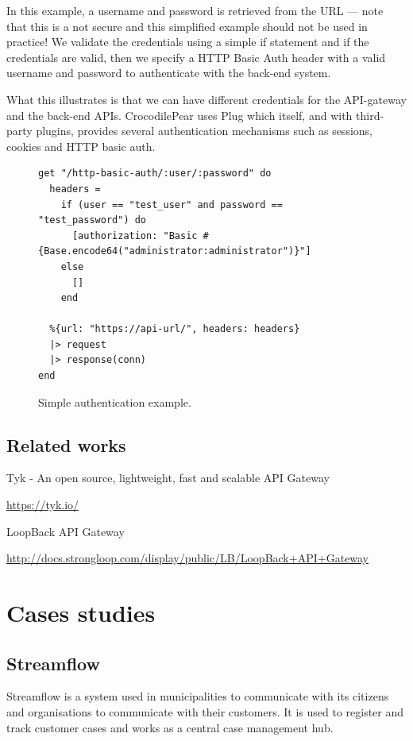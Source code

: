 \documentclass{cslthse-msc}
\begin{document}
In this example, a username and password is retrieved from the URL --- note that this is a not secure and this simplified example should not be used in practice! We validate the credentials using a simple if statement and if the credentials are valid, then we specify a HTTP Basic Auth header with a valid username and password to authenticate with the back-end system.

What this illustrates is that we can have different credentials for the API-gateway and the back-end APIs. CrocodilePear uses Plug which itself, and with third-party plugins, provides several authentication mechanisms such as sessions, cookies and HTTP basic auth.

\begin{figure}[H]
  \centering
\begin{lstlisting}[breaklines=true,frame=single]
get "/http-basic-auth/:user/:password" do
  headers =
    if (user == "test_user" and password == "test_password") do
      [authorization: "Basic #{Base.encode64("administrator:administrator")}"]
    else
      []
    end
  
  %{url: "https://api-url/", headers: headers}
  |> request
  |> response(conn)
end
\end{lstlisting}
  \caption{Simple authentication example.}
\end{figure}

\section{Related works}
Tyk - An open source, lightweight, fast and scalable API Gateway

\url{https://tyk.io/}

\vspace{5mm}
\noindent LoopBack API Gateway

\url{http://docs.strongloop.com/display/public/LB/LoopBack+API+Gateway}


\chapter{Cases studies}
\section{Streamflow}
Streamflow\cite{streamflow} is a system used in municipalities to communicate with its citizens and organisations to communicate with their customers. It is used to register and track customer cases and works as a central case management hub.
\end{document}
